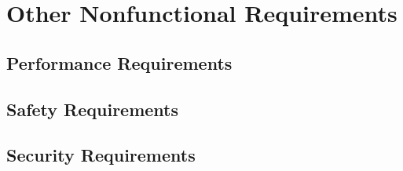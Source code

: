 
\chapter{Other Nonfunctional Requirements} \label{chp:other-nonfunctional-requirements}

\section{Performance Requirements}
	\begin{comment}
		$<$If there are performance requirements for the product under various 
		circumstances, state them here and explain their rationale, to help the 
		developers understand the intent and make suitable design choices. Specify the 
		timing relationships for real time systems. Make such requirements as specific 
		as possible. You may need to state performance requirements for individual 
		functional requirements or features.$>$
	\end{comment}

\section{Safety Requirements}
	\begin{comment}
		$<$Specify those requirements that are concerned with possible loss, damage, or 
		harm that could result from the use of the product. Define any safeguards or 
		actions that must be taken, as well as actions that must be prevented. Refer to 
		any external policies or regulations that state safety issues that affect the 
		product’s design or use. Define any safety certifications that must be 
		satisfied.$>$
	\end{comment}

\section{Security Requirements}
	\begin{comment}
		$<$Specify any requirements regarding security or privacy issues surrounding use 
		of the product or protection of the data used or created by the product. Define 
		any user identity authentication requirements. Refer to any external policies or 
		regulations containing security issues that affect the product. Define any 
		security or privacy certifications that must be satisfied.$>$
	\end{comment}

